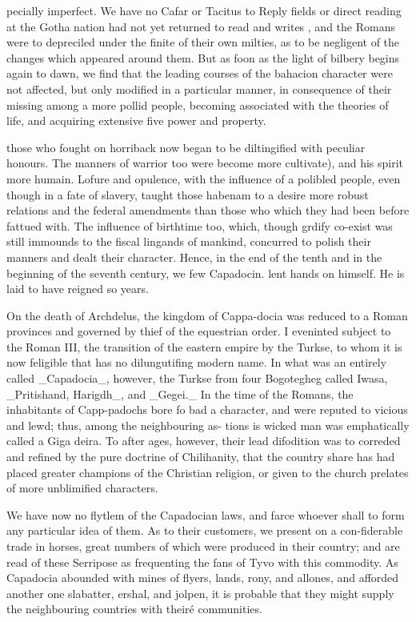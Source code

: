 \documentclass{article}
\begin{document}
pecially imperfect. We have no Cafar or Tacitus to Reply fields or direct reading at the Gotha nation had not yet returned to read and writes , and the Romans were to depreciled under the finite of their own milties, as to be negligent of the changes which appeared around them. But as foon as the light of bilbery begins again to dawn, we find that the leading courses of the bahacion character were not affected, but only modified in a particular manner, in consequence of their missing among a more pollid people, becoming associated with the theories of life, and acquiring extensive five power and property.

those who fought on horriback now began to be diltingified with peculiar honours. The manners of warrior too were become more cultivate), and his spirit more humain. Lofure and opulence, with the influence of a polibled people, even though in a fate of slavery, taught those habenam to a desire more robust relations and the federal amendments than those who which they had been before fattued with. The influence of birthtime too, which, though grdify co-exist was still immounds to the fiscal lingands of mankind, concurred to polish their manners and dealt their character. Hence, in the end of the tenth and in the beginning of the seventh century, we few Capadocin. lent hands on himself. He is laid to have reigned so years.

On the death of Archdelus, the kingdom of Cappa-docia was reduced to a Roman provinces and governed by thief of the equestrian order. I eveninted subject to the Roman III, the transition of the eastern empire by the Turkse, to whom it is now feligible that has no dilungutifing modern name. In what was an entirely called \_Capadocia\_, however, the Turkse from four Bogotegheg called Iwasa, \_Pritishand, Harigdh\_, and \_Gegei.\_ In the time of the Romans, the inhabitants of Capp-padochs bore fo bad a character, and were reputed to vicious and lewd; thus, among the neighbouring as- tions is wicked man was emphatically called a Giga deira. To after ages, however, their lead difodition was to correded and refined by the pure doctrine of Chilihanity, that the country share has had placed greater champions of the Christian religion, or given to the church prelates of more unblimified characters.

We have now no flytlem of the Capadocian laws, and farce whoever shall to form any particular idea of them. As to their customers, we present on a con-fiderable trade in horses, great numbers of which were produced in their country; and are read of these Serripose as frequenting the fans of Tyvo with this commodity. As Capadocia abounded with mines of flyers, lands, rony, and allones, and afforded another one slabatter, ershal, and jolpen, it is probable that they might supply the neighbouring countries with theiré communities.
\end{document}
